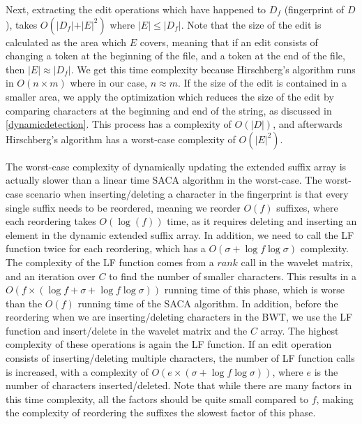 Next, extracting the edit operations which have happened to $D_f$ (fingerprint of $D$),
takes $O(\vert D_f\vert + \vert E\vert^2)$ where $\vert E\vert \leq \vert D_f\vert$. Note
that the size of the edit is calculated as the area which $E$ covers, meaning that if an
edit consists of changing a token at the beginning of the file, and a token at the end of
the file, then $\vert E\vert \approx \vert D_f\vert$. We get this time complexity because
Hirschberg's algorithm runs in $O(n \times m)$ where in our case, $n \approx m$. If the
size of the edit is contained in a smaller area, we apply the optimization which reduces
the size of the edit by comparing characters at the beginning and end of the string, as
discussed in \cref{dynamicdetection}. This process has a complexity of $O(\vert D\vert)$,
and afterwards Hirschberg's algorithm has a worst-case complexity of $O(\vert E\vert^2)$.

The worst-case complexity of dynamically updating the extended suffix array is actually
slower than a linear time SACA algorithm in the worst-case. The worst-case scenario when
inserting/deleting a character in the fingerprint is that every single suffix needs to be
reordered, meaning we reorder $O(f)$ suffixes, where each reordering takes $O(\log(f))$
time, as it requires deleting and inserting an element in the dynamic extended suffix
array. In addition, we need to call the LF function twice for each reordering, which has a
$O(\sigma + \log f \log\sigma)$ complexity. The complexity of the LF function comes from a
$rank$ call in the wavelet matrix, and an iteration over $C$ to find the number of smaller
characters. This results in a $O(f \times (\log f + \sigma + \log f \log\sigma))$ running
time of this phase, which is worse than the $O(f)$ running time of the SACA algorithm. In
addition, before the reordering when we are inserting/deleting characters in the BWT, we
use the LF function and insert/delete in the wavelet matrix and the $C$ array. The highest
complexity of these operations is again the LF function. If an edit operation consists of
inserting/deleting multiple characters, the number of LF function calls is increased, with
a complexity of $O(e \times (\sigma + \log f \log\sigma))$, where $e$ is the number of
characters inserted/deleted. Note that while there are many factors in this time
complexity, all the factors should be quite small compared to $f$, making the complexity of
reordering the suffixes the slowest factor of this phase.

